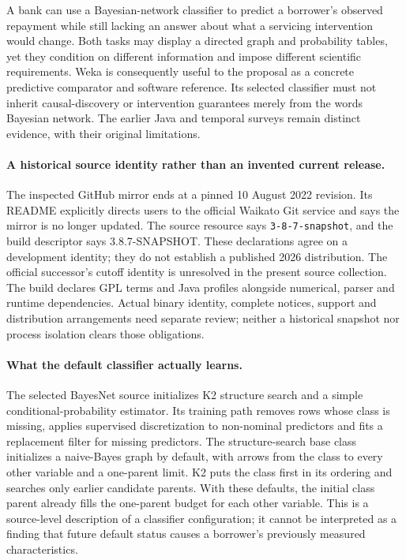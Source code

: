 A bank can use a Bayesian-network classifier to predict a borrower's observed
repayment while still lacking an answer about what a servicing intervention
would change. Both tasks may display a directed graph and probability tables,
yet they condition on different information and impose different scientific
requirements. Weka is consequently useful to the proposal as a concrete
predictive comparator and software reference. Its selected classifier must not
inherit causal-discovery or intervention guarantees merely from the words
Bayesian network. The earlier Java and temporal surveys remain distinct
evidence, with their original limitations.~\citep{exec13_java_weka,exec15_javatemporal_weka,exec24_weka_source}

\paragraph{A historical source identity rather than an invented current release.}
The inspected GitHub mirror ends at a pinned 10 August 2022 revision. Its
README explicitly directs users to the official Waikato Git service and says
the mirror is no longer updated. The source resource says
\texttt{3-8-7-snapshot}, and the build descriptor says 3.8.7-SNAPSHOT. These
declarations agree on a development identity; they do not establish a published
2026 distribution. The official successor's cutoff identity is unresolved in
the present source collection. The build declares GPL terms and Java profiles
alongside numerical, parser and runtime dependencies. Actual binary identity,
complete notices, support and distribution arrangements need separate review;
neither a historical snapshot nor process isolation clears those obligations.
\citep{exec24_weka_source}

\paragraph{What the default classifier actually learns.}
The selected BayesNet source initializes K2 structure search and a simple
conditional-probability estimator. Its training path removes rows whose class
is missing, applies supervised discretization to non-nominal predictors and
fits a replacement filter for missing predictors. The structure-search base
class initializes a naive-Bayes graph by default, with arrows from the class
to every other variable and a one-parent limit. K2 puts the class first in
its ordering and searches only earlier candidate parents. With these defaults,
the initial class parent already fills the one-parent budget for each other
variable. This is a source-level description of a classifier configuration;
it cannot be interpreted as a finding that future default status causes a
borrower's previously measured characteristics.~\citep{exec24_weka_source}

